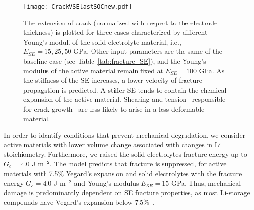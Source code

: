 \documentclass[final,5p,sort&compress]{elsarticle}
\begin{document}
\begin{figure}
\texttt{[image: CrackVSElastSOCnew.pdf]} 
\caption{The extension of crack (normalized with respect to the electrode thickness) is plotted for three cases characterized by different Young's moduli of the solid electrolyte material, i.e., $E_{SE} = 15, 25, 50$ GPa. Other input parameters are the same of the baseline case (see Table~\ref{tab:fracture_SE}), and the Young's modulus of the active material remain fixed at $E_{SE} = 100$ GPa. As the stiffness of the SE increases, a lower velocity of fracture propagation is predicted. 
A stiffer SE tends to contain the chemical expansion of the active material. Shearing and tension --responsible for crack growth-- are less likely to arise in a less deformable material.}
\label{fig:crackL_vsElasticProp}
\end{figure}

In order to identify conditions that prevent mechanical degradation, we consider active materials with lower volume change associated with changes in Li stoichiometry. 
Furthermore, we raised the solid electrolytes fracture energy up to $G_c = 4.0$ J m$^{-2}$.
The model predicts that fracture is suppressed, for active materials with 7.5\% Vegard's expansion and solid electrolytes with the fracture energy $G_c = 4.0$ J m$^{-2}$ and Young's modulus $E_{SE} = 15$ GPa.
Thus, mechanical damage is predominantly dependent on SE fracture properties,
as most Li-storage compounds 
have Vegard's expansion below 7.5\%~\cite{woodford:thesis,Mukhopadhyay2014}.
\end{document}
